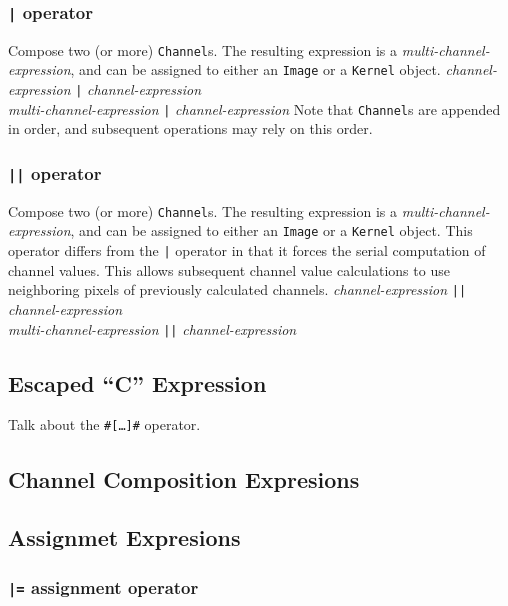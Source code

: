 \subsubsection{\texttt{|} operator}
\label{sssec:barop}
Compose two (or more) \texttt{Channel}s. The resulting expression is a
\emph{multi-channel-expression}, and can be assigned to either an \texttt{Image}
or a \texttt{Kernel} object.
\startsyn
\emph{channel-expression} \texttt{|} \emph{channel-expression} \\
\emph{multi-channel-expression} \texttt{|} \emph{channel-expression}
\stopsyn
Note that \texttt{Channel}s are appended in order, and subsequent operations
may rely on this order.

\subsubsection{\texttt{||} operator}
\label{sssec:doublebarop}
Compose two (or more) \texttt{Channel}s. The resulting expression is a
\emph{multi-channel-expression}, and can be assigned to either an \texttt{Image}
or a \texttt{Kernel} object. This operator differs from the \texttt{|} operator in that
it forces the serial computation of channel values. This allows subsequent channel
value calculations to use neighboring pixels of previously calculated channels.
\startsyn
\emph{channel-expression} \texttt{||} \emph{channel-expression} \\
\emph{multi-channel-expression} \texttt{||} \emph{channel-expression}
\stopsyn

\subsection{Escaped ``C'' Expression}
\label{ssec:escapedC}
Talk about the \texttt{\#[\ldots]\#} operator.

\subsection{Channel Composition Expresions}

\subsection{Assignmet Expresions}
\label{ssec:assignment}

\subsubsection{\texttt{|=} assignment operator}

